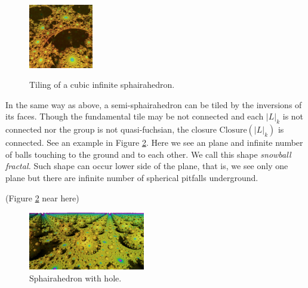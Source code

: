 \documentclass[suppldata, dvipdfmx]{interact}
\theoremstyle{plain}%
\theoremstyle{definition}
\theoremstyle{remark}
\theoremstyle{problemstyle}
\begin{document}
\begin{figure}[h!tbp]
\begin{minipage}[t]{0.18\textwidth}
  \label{fig:terrainStep10}
 \end{minipage}
 \hspace*{\fill}
 \begin{minipage}[t]{0.18\textwidth}
  \centering
  \includegraphics[height=1.1in, keepaspectratio]{./img/constructFractal/terrainProcess/final.jpg}
  \label{fig:sphairaPrismFinal}
 \end{minipage}
 \caption{Tiling of a cubic infinite sphairahedron.}
 \label{fig:sphairahedralPrismTile}
\end{figure}

In the same way as above, a semi-sphairahedron
can be tiled by the inversions of its faces.
Though the fundamental tile may be not connected and each $|L|_k$ is not connected nor the group is not quasi-fuchsian, the closure $\text{Closure}(|L|_k)$ is connected.  
See an example in Figure \ref{fig:semiSphairaSpheres}.  Here we see an plane and infinite number of balls touching to the ground and to each other.  We call this shape {\it snowball fractal.}  Such shape can occur lower side of the plane, that is, we see only one plane but there are infinite number of spherical pitfalls underground.

(Figure \ref{fig:semiSphairaSpheres} near here)
\begin{figure}[h!tbp]
  \centering
 \includegraphics[width=2in,
 keepaspectratio]{./img/constructFractal/semi-terrain2.jpg}
 \caption{Sphairahedron with hole.}
  \label{fig:semiSphairaSpheres}
\end{figure}
\end{document}
